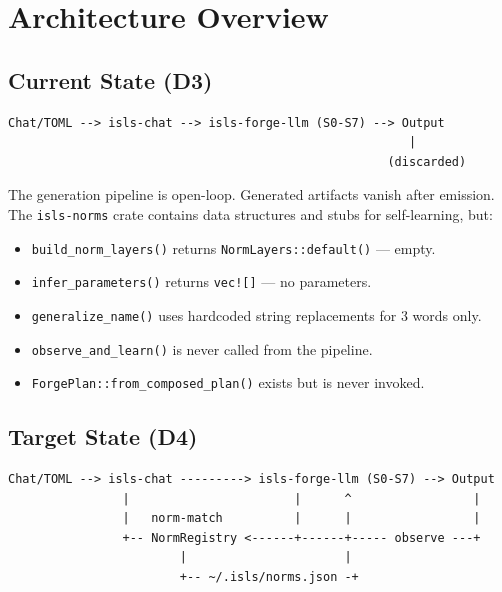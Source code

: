 \documentclass[11pt,a4paper]{article}
\begin{document}
\section{Architecture Overview}

\subsection{Current State (D3)}

\begin{lstlisting}[style=bash]
Chat/TOML --> isls-chat --> isls-forge-llm (S0-S7) --> Output
                                                        |
                                                     (discarded)
\end{lstlisting}

The generation pipeline is open-loop. Generated artifacts vanish after 
emission. The \texttt{isls-norms} crate contains data structures and 
stubs for self-learning, but:

\begin{itemize}[nosep]
\item \texttt{build\_norm\_layers()} returns \texttt{NormLayers::default()} 
      --- empty.
\item \texttt{infer\_parameters()} returns \texttt{vec![]} --- no parameters.
\item \texttt{generalize\_name()} uses hardcoded string replacements for 
      3 words only.
\item \texttt{observe\_and\_learn()} is never called from the pipeline.
\item \texttt{ForgePlan::from\_composed\_plan()} exists but is never invoked.
\end{itemize}

\subsection{Target State (D4)}

\begin{lstlisting}[style=bash]
Chat/TOML --> isls-chat ---------> isls-forge-llm (S0-S7) --> Output
                |                       |      ^                 |
                |   norm-match          |      |                 |
                +-- NormRegistry <------+------+----- observe ---+
                        |                      |
                        +-- ~/.isls/norms.json -+
\end{lstlisting}
\end{document}

